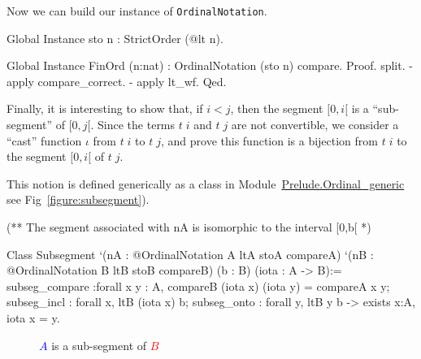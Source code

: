 Now we can build our instance of \texttt{OrdinalNotation}.

\begin{Coqsrc}
Global Instance sto n : StrictOrder (@lt n).

Global Instance FinOrd (n:nat) : OrdinalNotation (sto n) compare.
Proof.
  split.
  - apply compare_correct.
  - apply lt_wf.
Qed.
\end{Coqsrc}

Finally, it is interesting to show that, if $i<j$, then the segment $[0,i[$ is a ``sub-segment'' of
$[0,j[$. Since the terms  $t\;i$ and $t\;j$ are not convertible, we consider a ``cast'' 
function $\iota$ from $t\;i$ to $t\;j$, and prove this function is  a bijection  from $t\;i$ to
the segment $[0,i[$ of $t\;j$.



This notion is defined generically as a class in
 Module~\href{../src/html/hydras.Prelude.Ordinal-generic.html}{Prelude.Ordinal\_generic} see Fig~\vref{figure:subsegment}).

\begin{Coqsrc}
(** The segment associated with nA is isomorphic to
    the interval [0,b[ *)

Class  Subsegment 
       `(nA : @OrdinalNotation A ltA stoA compareA)
       `(nB : @OrdinalNotation B ltB stoB compareB)
       (b :  B)
       (iota : A -> B):=
  {
  subseg_compare :forall x y : A,  compareB (iota x) (iota y) =
                                 compareA x y;
  subseg_incl : forall x, ltB (iota x) b;
  subseg_onto : forall y, ltB y b  -> exists x:A, iota x = y}.
\end{Coqsrc}


 \begin{figure}[h]
   \centering
   \caption{\textcolor{blue}{$A$} is a sub-segment  of \textcolor{red}{$B$}}
   \label{fig:subsegment}
 \end{figure}


